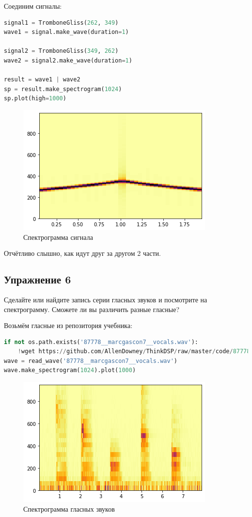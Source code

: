 Соединим сигналы:
\begin{lstlisting}[language=Python]
signal1 = TromboneGliss(262, 349)
wave1 = signal.make_wave(duration=1)

signal2 = TromboneGliss(349, 262)
wave2 = signal2.make_wave(duration=1)

result = wave1 | wave2
sp = result.make_spectrogram(1024)
sp.plot(high=1000)
\end{lstlisting}
\begin{figure}[H]
	\begin{center}
		\includegraphics[scale=1]{fig/lab03/lab03_42_0.png}
		\caption{Спектрограмма сигнала}
	\end{center}
\end{figure}

Отчётливо слышно, как идут друг за другом 2 части.


\subsection{Упражнение 6}

Сделайте или найдите запись серии гласных звуков и посмотрите на спектрограмму. Сможете ли вы различить разные гласные?

Возьмём гласные из репозитория учебника:

\begin{lstlisting}[language=Python]
if not os.path.exists('87778__marcgascon7__vocals.wav'):
    !wget https://github.com/AllenDowney/ThinkDSP/raw/master/code/87778__marcgascon7__vocals.wav
wave = read_wave('87778__marcgascon7__vocals.wav')
wave.make_spectrogram(1024).plot(1000)
\end{lstlisting}
\begin{figure}[H]
	\begin{center}
		\includegraphics[scale=1]{fig/lab03/lab03_47_0.png}
		\caption{Спектрограмма гласных звуков}
	\end{center}
\end{figure}

